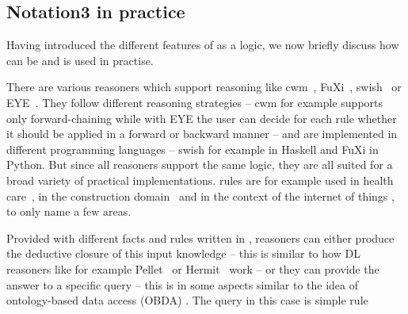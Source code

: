 



\subsection{Notation3 in practice}
\sloppy
Having introduced the different features of \nthree as a logic, we now briefly discuss how \nthree can be and is used in practise. 
% 

There are various reasoners which support \nthree reasoning like cwm~\cite{cwm}, FuXi~\cite{fuxi}, swish~\cite{swish} or EYE~\cite{eye}. They follow different reasoning strategies
--
cwm for example supports only  forward-chaining while with EYE the user can decide for each rule whether it should be applied in a forward or backward manner -- and are implemented 
in different programming languages -- swish for example in Haskell and FuXi in Python. But since all reasoners support the same logic, they are all suited for 
a broad variety of practical 
implementations. \nthree rules are for example used in health care~\cite{sun,dou}, in the construction domain~\cite{bau} and in the context of the internet of things \cite{iot}, 
to only name a few areas.

Provided with different facts and rules written in \nthree, reasoners can either produce the deductive closure of this input knowledge -- this is similar to how \owl DL reasoners
like for example 
Pellet~\cite{Pellet} or Hermit~\cite{hermit} work -- or they can provide the answer to a specific query -- this is in some aspects similar to the idea of 
ontology-based data access (OBDA) \cite{obda}. The query in this case is simple \nthree rule 







